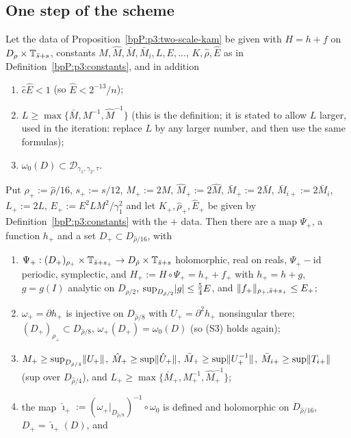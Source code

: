 \subsection{One step of the scheme}\label{bpP:p3:stepsec}

\begin{lemma}\label{bpP:p3:step}
Let the data of Proposition~\ref{bpP:p3:two-scale-kam} be given with $H=h+f$ on $D_\rho\times\mathbb{T}_{\bar s+s}$, constants $M,\hat M,\bar M,\bar M_i,L,E,\ldots$, $K,\hat\rho,\hat E$ as in Definition~\ref{bpP:p3:constants},
and in addition
\begin{enumerate}[label=(S\arabic*)]
\item $\hat c\hat E<1$ (so $\hat E<2^{-13}/n$);
\item $L\ge\max\{\bar M,M^{-1},\hat M^{-1}\}$ (this is the definition; it is stated to allow $L$ larger, used in the iteration: replace $L$ by any larger number, and then use the same formulas);
\item $\omega_0(D)\subset\mathcal D_{\gamma_1,\gamma_2,\tau}$.
\end{enumerate}
Put $\rho_+:=\hat\rho/16$, $s_+:=s/12$, $M_+:=2M$, $\hat M_+:=2\hat M$, $\bar M_+:=2\bar M$, $\bar M_{i+}:=2\bar M_i$, $L_+:=2L$, $E_+:=E^2LM^2/\gamma_1^2$ and let $K_+,\hat\rho_+,\hat E_+$ be given by Definition~\ref{bpP:p3:constants} with the $+$ data. Then there are a map $\Psi_+$, a function $h_+$ and a set $D_+\subset D_{\hat\rho/16}$, with
\begin{enumerate}[label=(\roman*)]
\item $\Psi_+:(D_+)_{\rho_+}\times\mathbb{T}_{\bar s+s_+}\to D_{\hat\rho}\times\mathbb{T}_{\bar s+s}$ holomorphic, real on reals, $\Psi_+-\mathrm{id}$ periodic, symplectic, and $H_+:=H\circ\Psi_+=h_++f_+$ with $h_+=h+g$, $g=g(I)$ analytic on $D_{\hat\rho/2}$, $\sup_{D_{\hat\rho/2}}\lvert g\rvert\le\frac54E$, and $\lVert f_+\rVert_{\rho_+,\bar s+s_+}\le E_+$;
\item $\omega_+=\partial h_+$ is injective on $D_{\hat\rho/8}$ with $U_+=\partial^2h_+$ nonsingular there; $(D_+)_{\rho_+}\subset D_{\hat\rho/8}$, $\omega_+(D_+)=\omega_0(D)$ (so (S3) holds again);
\item $M_+\ge\sup_{D_{\hat\rho/4}}\lVert U_+\rVert$, $\hat M_+\ge\sup\lVert \hat U_+\rVert$, $\bar M_+\ge\sup\lVert U_+^{-1}\rVert$, $\bar M_{i+}\ge\sup\lVert T_{i+}\rVert$ (sup over $D_{\hat\rho/4}$), and $L_+\ge\max\{\bar M_+,M_+^{-1},\hat M_+^{-1}\}$;
\item the map $\hat\imath_+:=(\omega_+|_{D_{\hat\rho/8}})^{-1}\circ\omega_0$ is defined and holomorphic on $D_{\hat\rho/16}$, $D_+=\hat\imath_+(D)$, and

\end{enumerate}
\end{lemma}
